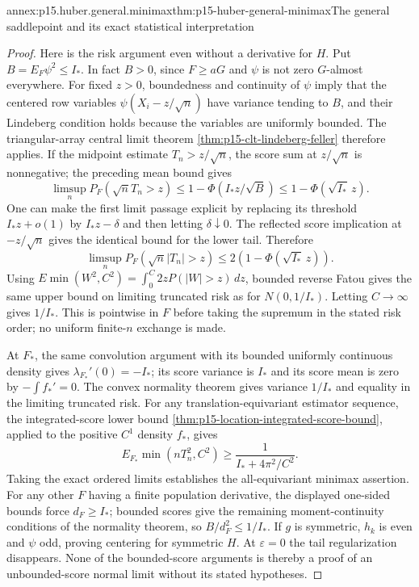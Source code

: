 \begin{annexitem}{annex:p15.huber.general.minimax}{thm:p15-huber-general-minimax}{The general saddlepoint and its exact statistical interpretation}
\begin{proof}
Here is the risk argument even without a derivative for \(H\).
Put \(B=E_F\psi^2\leq I_*\). In fact \(B>0\), since \(F\geq aG\)
and \(\psi\) is not zero \(G\)-almost everywhere.
For fixed \(z>0\), boundedness and continuity of \(\psi\) imply
that the centered row variables \(\psi(X_i-z/\sqrt n)\)
have variance tending to \(B\), and their Lindeberg condition holds
because the variables are uniformly bounded.
The triangular-array central limit theorem
\cref{thm:p15-clt-lindeberg-feller} therefore applies.
If the midpoint estimate \(T_n>z/\sqrt n\), the score sum at
\(z/\sqrt n\) is nonnegative; the preceding mean bound gives
\[
 \limsup_n P_F(\sqrt n T_n>z)
      \leq 1-\Phi(I_*z/\sqrt B)
      \leq1-\Phi(\sqrt{I_*}\,z).
\]
One can make the first limit passage explicit by replacing its
threshold \(I_*z+o(1)\) by \(I_*z-\delta\) and then letting
\(\delta\downarrow0\). The reflected score implication at
\(-z/\sqrt n\) gives the identical bound for the lower tail.
Therefore
\[
 \limsup_n P_F(\sqrt n|T_n|>z)
       \leq2(1-\Phi(\sqrt{I_*}\,z)).
\]
Using
\(E\min(W^2,C^2)=\int_0^C2zP(|W|>z)\,dz\),
bounded reverse Fatou gives the same upper bound on limiting
truncated risk as for \(N(0,1/I_*)\).
Letting \(C\to\infty\) gives \(1/I_*\).
This is pointwise in \(F\) before taking the supremum in the
stated risk order; no uniform finite-\(n\) exchange is made.

At \(F_*\), the same convolution argument with its bounded uniformly
continuous density gives \(\lambda_{F_*}'(0)=-I_*\);
its score variance is \(I_*\) and its score mean is zero by
\(-\int f_*'=0\). The convex normality theorem gives variance
\(1/I_*\) and equality in the limiting truncated risk.
For any translation-equivariant estimator sequence, the
integrated-score lower bound
\cref{thm:p15-location-integrated-score-bound}, applied to the
positive \(C^1\) density \(f_*\), gives
\[
 E_{F_*}\min(nT_n^2,C^2)
       \geq\frac1{I_*+4\pi^2/C^2}.
\]
Taking the exact ordered limits establishes the all-equivariant
minimax assertion. For any other \(F\) having a finite population
derivative, the displayed one-sided bounds force \(d_F\geq I_*\);
bounded scores give the remaining moment-continuity conditions
of the normality theorem, so \(B/d_F^2\leq1/I_*\).
If \(g\) is symmetric, \(h_k\) is even and \(\psi\) odd, proving
centering for symmetric \(H\).
At \(\varepsilon=0\) the tail regularization disappears. None of
the bounded-score arguments is thereby a proof of an unbounded-score
normal limit without its stated hypotheses.
\end{proof}
\end{annexitem}


